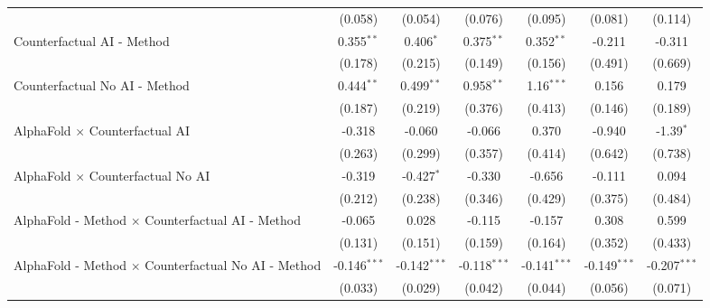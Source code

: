\begin{tabular}{lcccccc}
                                                              & (0.058)        & (0.054)        & (0.076)        & (0.095)        & (0.081)        & (0.114)\\   
   Counterfactual AI - Method                                 & 0.355$^{**}$   & 0.406$^{*}$    & 0.375$^{**}$   & 0.352$^{**}$   & -0.211         & -0.311\\   
                                                              & (0.178)        & (0.215)        & (0.149)        & (0.156)        & (0.491)        & (0.669)\\   
   Counterfactual No AI - Method                              & 0.444$^{**}$   & 0.499$^{**}$   & 0.958$^{**}$   & 1.16$^{***}$   & 0.156          & 0.179\\   
                                                              & (0.187)        & (0.219)        & (0.376)        & (0.413)        & (0.146)        & (0.189)\\   
   AlphaFold $\times$ Counterfactual AI                       & -0.318         & -0.060         & -0.066         & 0.370          & -0.940         & -1.39$^{*}$\\   
                                                              & (0.263)        & (0.299)        & (0.357)        & (0.414)        & (0.642)        & (0.738)\\   
   AlphaFold $\times$ Counterfactual No AI                    & -0.319         & -0.427$^{*}$   & -0.330         & -0.656         & -0.111         & 0.094\\   
                                                              & (0.212)        & (0.238)        & (0.346)        & (0.429)        & (0.375)        & (0.484)\\   
   AlphaFold - Method $\times$ Counterfactual AI - Method     & -0.065         & 0.028          & -0.115         & -0.157         & 0.308          & 0.599\\   
                                                              & (0.131)        & (0.151)        & (0.159)        & (0.164)        & (0.352)        & (0.433)\\   
   AlphaFold - Method $\times$ Counterfactual No AI - Method  & -0.146$^{***}$ & -0.142$^{***}$ & -0.118$^{***}$ & -0.141$^{***}$ & -0.149$^{***}$ & -0.207$^{***}$\\   
                                                              & (0.033)        & (0.029)        & (0.042)        & (0.044)        & (0.056)        & (0.071)\\   

\end{tabular}
